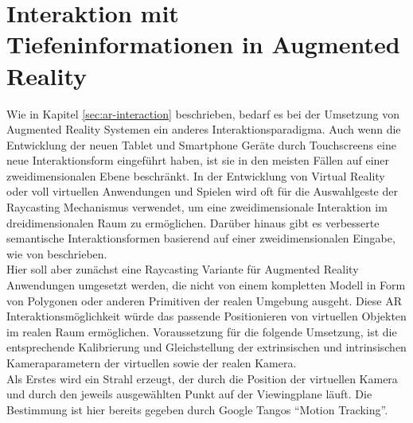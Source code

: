 \section{Interaktion mit Tiefeninformationen in Augmented Reality}

Wie in Kapitel \ref{sec:ar-interaction} beschrieben, bedarf es bei der Umsetzung von Augmented Reality Systemen ein anderes Interaktionsparadigma. Auch wenn die Entwicklung der neuen Tablet und Smartphone Geräte durch Touchscreens eine neue Interaktionsform eingeführt haben, ist sie in den meisten Fällen auf einer zweidimensionalen Ebene beschränkt. In der Entwicklung von Virtual Reality oder voll virtuellen Anwendungen und Spielen wird oft für die Auswahlgeste der Raycasting Mechanismus verwendet, um eine zweidimensionale Interaktion im dreidimensionalen Raum zu ermöglichen. Darüber hinaus gibt es verbesserte semantische Interaktionsformen basierend auf einer zweidimensionalen Eingabe, wie von \citet{elmqvist2008semantic} beschrieben.\\

Hier soll aber zunächst eine Raycasting Variante für Augmented Reality Anwendungen umgesetzt werden, die nicht von einem kompletten Modell in Form von Polygonen oder anderen Primitiven der realen Umgebung ausgeht. Diese AR Interaktionsmöglichkeit würde das passende Positionieren von virtuellen Objekten im realen Raum ermöglichen. Voraussetzung für die folgende Umsetzung, ist die entsprechende Kalibrierung und Gleichstellung der extrinsischen und intrinsischen Kameraparametern der virtuellen sowie der realen Kamera. \\

Als Erstes wird ein Strahl erzeugt, der durch die Position der virtuellen Kamera und durch den jeweils ausgewählten Punkt auf der Viewingplane läuft. Die Bestimmung ist hier bereits gegeben durch Google Tangos \enquote{Motion Tracking}. 